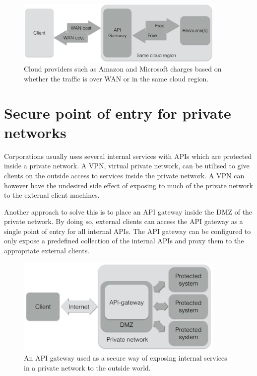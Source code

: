 \documentclass{cslthse-msc}
\begin{document}
\begin{figure}[H]
  \centering
    \begin{center}
      \includegraphics[width=0.9\textwidth]{images/api_gateway_bandwidth.png}
    \end{center}
  \caption{Cloud providers such as Amazon\cite{cloud_amazon} and Microsoft\cite{cloud_microsoft} charges based on whether the traffic is over WAN or in the same cloud region.}
\end{figure}

\section{Secure point of entry for private networks}
Corporations usually uses several internal services with APIs which are protected inside a private network. A VPN, virtual private network, can be utilised to give clients on the outside access to services inside the private network. A VPN can however have the undesired side effect of exposing to much of the private network to the external client machines.

Another approach to solve this is to place an API gateway inside the DMZ of the private network. By doing so, external clients can access the API gateway as a single point of entry for all internal APIs. The API gateway can be configured to only expose a predefined collection of the internal APIs and proxy them to the appropriate external clients.

\begin{figure}[H]
  \centering
    \begin{center}
      \includegraphics[width=0.9\textwidth]{images/api_gateway_dmz.png}
    \end{center}
  \caption{An API gateway used as a secure way of exposing internal services in a private network to the outside world.}
\end{figure}
\end{document}
